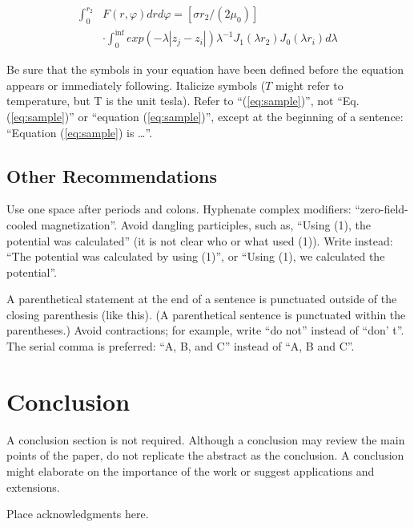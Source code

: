 \documentclass{ifacconf}
\begin{document}
\begin{equation} \label{eq:sample2}
\begin{array}{ll}
\int_0^{r_2} & F (r, \varphi ) dr d\varphi = [\sigma r_2 / (2 \mu_0 )] \\
& \cdot \int_0^{\inf} exp(-\lambda |z_j - z_i |) \lambda^{-1} J_1 (\lambda  r_2 ) J_0 (\lambda r_i ) d\lambda 
\end{array}
\end{equation}

Be sure that the symbols in your equation have been defined before the
equation appears or immediately following. Italicize symbols ($T$
might refer to temperature, but T is the unit tesla). Refer to
``(\ref{eq:sample})'', not ``Eq. (\ref{eq:sample})'' or ``equation
(\ref{eq:sample})'', except at the beginning of a sentence: ``Equation
(\ref{eq:sample}) is \ldots''.

\subsection{Other Recommendations}

Use one space after periods and colons. Hyphenate complex modifiers:
``zero-field-cooled magnetization''. Avoid dangling participles, such
as, ``Using (1), the potential was calculated'' (it is not clear who or
what used (1)). Write instead: ``The potential was calculated by using
(1)'', or ``Using (1), we calculated the potential''.

A parenthetical statement at the end of a sentence is punctuated
outside of the closing parenthesis (like this). (A parenthetical
sentence is punctuated within the parentheses.) Avoid contractions;
for example, write ``do not'' instead of ``don' t''. The serial comma
is preferred: ``A, B, and C'' instead of ``A, B and C''.


\section{Conclusion}

A conclusion section is not required. Although a conclusion may review
the main points of the paper, do not replicate the abstract as the
conclusion. A conclusion might elaborate on the importance of the work
or suggest applications and extensions.

\begin{ack}
Place acknowledgments here.
\end{ack}

                                                   
\end{document}

